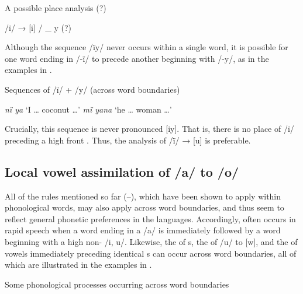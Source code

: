 \ea%
    \label{ex:phon:79}
          A possible place  analysis (?)

    /ï/ → [i] / \_ y (?)
\z

Although the sequence /ïy/ never occurs within a single word, it is possible for one word ending in /-ï/ to precede another beginning with /-y/, as in the examples in .

\newpage

\ea%
    \label{ex:phon:80}
          Sequences of /ï/ + /y/ (across word boundaries)

    \ea  \textit{nï ya} ‘I … coconut …’
    \ex  \textit{mï yana} ‘he … woman …’
    \z
\z

Crucially, this sequence is never pronounced [iy]. That is, there is no place  of /ï/ preceding a high front . Thus, the   analysis of /ï/ → [u] is preferable.


\subsection{Local vowel assimilation of /a/ to /o/}\label{sec:2.5.7}


All of the rules mentioned so far (--), which have been shown to apply within phonological words, may also apply across word boundaries, and thus seem to reflect general phonetic preferences in the languages. Accordingly,  often occurs in rapid speech when a word ending in a  /a/ is immediately followed by a word beginning with a high non- /i, u/. Likewise, the  of s, the  of /u/ to [w], and the  of vowels immediately preceding identical s can occur across word boundaries, all of which are illustrated in the examples in .

\ea%
    \label{ex:phon:81}
          Some phonological processes occurring across word boundaries

